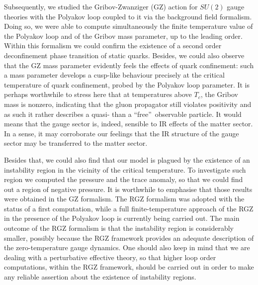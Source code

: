 Subsequently, we studied the Gribov-Zwanziger (GZ) action for $SU(2)$ gauge theories
with the Polyakov loop coupled to it via the background field formalism. Doing so, we were able
to compute simultaneously the finite temperature value of the Polyakov loop and of the
Gribov mass parameter, up to the leading order. Within this formalism we could confirm the
existence of a second order deconfinement phase transition of static quarks. Besides, we could
also observe that the GZ mass parameter evidently feels the effects of quark confinement: 
such a mass parameter develops a cusp-like behaviour precisely at the critical temperature of
quark confinement, probed by the Polyakov loop parameter. It is perhaps worthwhile to stress
here that at temperatures above $T_{c}$, the Gribov mass is nonzero, indicating that the gluon
propagator still violates positivity and as such it rather describes a quasi- than a
\textquotedblleft free\textquotedblright\ observable particle. It would means that the gauge
sector is, indeed, sensible to IR effects of the matter sector. In a sense, it may corroborate
our feelings that the IR structure of the gauge sector may be transferred to the matter sector.

Besides that, we could also find that our model is plagued by the existence of an instability
region in the vicinity of the critical temperature. To investigate such region we computed the
pressure and the trace anomaly, so that we could find out a region of negative pressure. It is
worthwhile to emphasise that those results were obtained in the GZ formalism. The RGZ formalism
was adopted with the status of a first computation, while a full finite-temperature approach of
the RGZ in the presence of the Polyakov loop is currently being carried out. The main outcome
of the RGZ formalism is that the instability region is considerably smaller, possibly because
the RGZ framework provides an adequate description of the zero-temperature gauge dynamics. One
should also keep in mind that we are dealing with a perturbative effective theory, so that
higher loop order computations, within the RGZ framework, should be carried out in order to
make any reliable assertion about the existence of instability regions.



